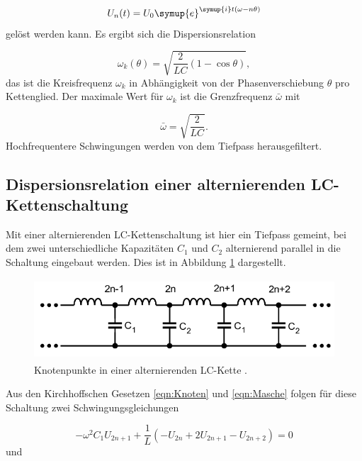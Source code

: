 \begin{equation}
  U_{n}(t) = U_0 \symup{e}^{\symup{i}t (\omega - n \theta)}
\end{equation}
gelöst werden kann.
Es ergibt sich die Dispersionsrelation

\begin{equation}
  \omega_k(\theta) = \sqrt{\frac{2}{LC}(1-\cos\theta)},
  \label{eqn:Dispersion}
\end{equation}
das ist die Kreisfrequenz
$\omega_k$ in Abhängigkeit von der Phasenverschiebung $\theta$ pro Kettenglied.
Der maximale Wert für $\omega_k$ ist die Grenzfrequenz $\bar{\omega}$
mit

\begin{equation}
  \bar{\omega} = \sqrt{\frac{2}{LC}}.
\end{equation}
Hochfrequentere Schwingungen werden von dem Tiefpass herausgefiltert.


\subsection{Dispersionsrelation einer alternierenden LC-Kettenschaltung}

Mit einer alternierenden LC-Kettenschaltung ist hier ein Tiefpass gemeint,
bei dem zwei unterschiedliche Kapazitäten $C_1$ und $C_2$ alternierend
parallel in die Schaltung eingebaut werden. Dies ist in Abbildung
\ref{fig:KetteLC1C2} dargestellt.

\newpage

\begin{figure}
  \centering
  \includegraphics[height=3cm]{KetteLC1C2.png}
  \caption{Knotenpunkte in einer alternierenden LC-Kette \cite{anleitung}.}
  \label{fig:KetteLC1C2}
\end{figure}

Aus den Kirchhoffschen Gesetzen \eqref{eqn:Knoten} und \eqref{eqn:Masche}
folgen für diese Schaltung zwei Schwingungsgleichungen

\begin{equation}
  -\omega^2 C_1 U_{2n+1} + \frac{1}{L}(-U_{2n}+2U_{2n+1}-U_{2n+2}) = 0
\end{equation}
und

